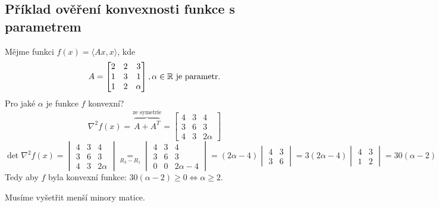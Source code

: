 \subsection{Příklad ověření konvexnosti funkce s parametrem}
Mějme funkci $f(x) = \langle Ax, x\rangle$, kde
\[
A = \begin{bmatrix}
    2 & 2 & 3 \\
    1 & 3 & 1 \\
    1 & 2 & \alpha
\end{bmatrix}, \alpha \in \mathbb{R} \text{ je parametr.}
\]
Pro jaké $\alpha$ je funkce $f$ konvexní?
\[
    \nabla^2 f(x) = \overbrace{A + A^T}^{\text{ze symetrie}} =
    \begin{bmatrix}
        4 & 3 & 4 \\
        3 & 6 & 3 \\
        4 & 3 & 2 \alpha
    \end{bmatrix}
\]
\[
    \det \nabla^2 f(x) =
    \begin{vmatrix}
        4 & 3 & 4 \\
        3 & 6 & 3 \\
        4 & 3 & 2 \alpha
    \end{vmatrix} \underset{R_3 - R_1}{=}
    \begin{vmatrix}
        4 & 3 & 4 \\
        3 & 6 & 3 \\
        0 & 0 & 2 \alpha - 4
    \end{vmatrix} = (2 \alpha - 4)
    \begin{vmatrix}
        4 & 3 \\
        3 & 6
    \end{vmatrix} = 3 (2 \alpha - 4)
    \begin{vmatrix}
        4 & 3 \\
        1 & 2
    \end{vmatrix} = 30 (\alpha - 2)
\]
Tedy aby $f$ byla konvexní funkce: $30 (\alpha - 2) \geq 0 \iff \alpha \geq 2$.

Musíme vyšetřit menší minory matice.

